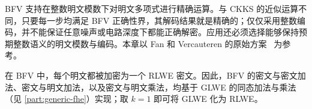 BFV 支持在整数明文模数下对明文多项式进行精确运算。与 CKKS 的近似运算不同，只要每一步均满足 BFV 正确性界，其解码结果就是精确的；仅仅采用整数编码，并不能保证任意噪声或电路深度下都能正确解密。应用还必须选择能够保持预期整数语义的明文模数与编码。本章以 Fan 和 Vercauteren 的原始方案~\cite{cryptoeprint:2012/144} 为参考。

在 BFV 中，每个明文都被加密为一个 RLWE 密文。因此，BFV 的密文与密文加法、密文与明文加法，以及密文与明文乘法，均基于 GLWE 的同态加法与乘法（见 \autoref{part:generic-fhe}）实现；取 $k = 1$ 即可将 GLWE 化为 RLWE。




\begin{tcolorbox}[
    title = \textbf{所需背景知识},    %
    colback = white,    %
    colframe = black,  %
    boxrule = 0.8pt,     %
    left = 1mm, right = 1mm, top = 1mm, bottom = 1mm %
]


\end{tcolorbox}
